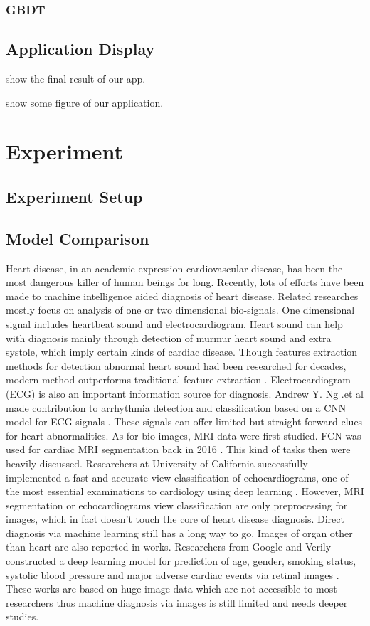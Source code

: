 \documentclass[letterpaper]{article} %
\begin{document}
\subsubsection{GBDT}

\subsection{Application Display}

show the final result of our app.

show some figure of our application.

\section{Experiment}

\subsection{Experiment Setup}

\subsection{Model Comparison}

Heart disease, in an academic expression cardiovascular disease, has been the most dangerous killer of human beings for long. Recently, lots of efforts have been made to machine intelligence aided diagnosis of heart disease. Related researches mostly focus on analysis of one or two dimensional bio-signals. One dimensional signal includes heartbeat sound and electrocardiogram. Heart sound can help with diagnosis mainly through detection of murmur heart sound and extra systole, which imply certain kinds of cardiac disease. Though features extraction methods for detection abnormal heart sound had been researched for decades, modern method outperforms traditional feature extraction \cite{cite1}. Electrocardiogram (ECG) is also an important information source for diagnosis. Andrew Y. Ng .et al made contribution to arrhythmia detection and classification based on a CNN model for ECG signals \cite{cite2}. These signals can offer limited but straight forward clues for heart abnormalities. As for bio-images, MRI data were first studied. FCN was used for cardiac MRI segmentation back in 2016 \cite{cite3}. This kind of tasks then were heavily discussed. Researchers at University of California successfully implemented a fast and accurate view classification of echocardiograms, one of the most essential examinations to cardiology using deep learning \cite{cite4}. However, MRI segmentation or echocardiograms view classification are only preprocessing for images, which in fact doesn’t touch the core of heart disease diagnosis. Direct diagnosis via machine learning still has a long way to go. Images of organ other than heart are also reported in works. Researchers from Google and Verily constructed a deep learning model for prediction of age, gender, smoking status, systolic blood pressure and major adverse cardiac events via retinal images \cite{cite5}. These works are based on huge image data which are not accessible to most researchers thus machine diagnosis via images is still limited and needs deeper studies.
\end{document}
